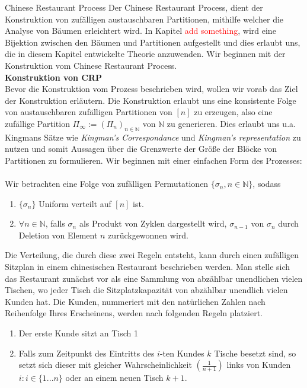 \begin{section}{Chinese Restaurant Process}
    Der \glqq Chinese Restaurant Process\grqq, dient der Konstruktion von zufälligen austauschbaren Partitionen, mithilfe welcher die Analyse von Bäumen erleichtert wird. In Kapitel \textcolor{red}{add something}, wird eine Bijektion zwischen den Bäumen und Partitionen aufgestellt und dies erlaubt uns, die in diesem Kapitel entwickelte Theorie anzuwenden. Wir beginnen mit der Konstruktion vom \glqq Chinese Restaurant Process\grqq.\\
\newline
\textbf{\fontsize{14}{18}\selectfont Konstruktion von CRP}
\\
Bevor die Konstruktion vom Prozess beschrieben wird, wollen wir vorab das Ziel der Konstruktion erläutern. Die Konstruktion erlaubt uns eine konsistente Folge von austauschbaren zufälligen Partitionen von $[n]$ zu erzeugen, also eine zufällige Partition $\Pi_\infty := (\Pi_n)_{n \in \mathbb{N}}$ von $\mathbb{N}$ zu generieren. Dies erlaubt uns u.a. Kingmans Sätze wie \textit{Kingman's Correspondance} und \textit{Kingman's representation} zu nutzen und somit Aussagen über die Grenzwerte der Größe der Blöcke von Partitionen zu formulieren. Wir beginnen mit einer einfachen Form des Prozesses: \\
\\
Wir betrachten eine Folge von zufälligen Permutationen $ \{\sigma_n, n \in \mathbb{N}\}$, sodass 
\begin{enumerate}
    \item $ \{\sigma_n\}$ Uniform verteilt auf $[n]$ ist.
    \item $\forall n \in \mathbb{N}$, falls $\sigma_n$ als Produkt von Zyklen dargestellt wird, $\sigma_{n-1}$ von $\sigma_n$ durch Deletion von Element $n$ zurückgewonnen wird.   
\end{enumerate}
Die Verteilung, die durch diese zwei Regeln entsteht, kann durch einen zufälligen Sitzplan in einem chinesischen Restaurant beschrieben werden. Man stelle sich das Restaurant zunächst vor als eine Sammlung von abzählbar unendlichen vielen Tischen, wo jeder Tisch die Sitzplatzkapazität von abzählbar unendlich vielen Kunden hat. Die Kunden, nummeriert mit den natürlichen Zahlen nach Reihenfolge Ihres Erscheinens, werden nach folgenden Regeln platziert.
\begin{enumerate}
    \item Der erste Kunde sitzt an Tisch 1
    \item Falls zum Zeitpunkt des Eintritts des $i$-ten Kundes $k$ Tische besetzt sind, so setzt sich dieser mit gleicher Wahrscheinlichkeit $(\frac{1}{n+1})$ links von Kunden $i: i \in \{1...n\}$ oder an einem neuen Tisch $k+1$.

\end{enumerate}
\end{section}
